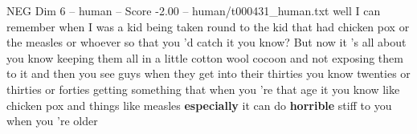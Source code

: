 \begin{textsample}{NEG Dim 6 – human – Score -2.00 – human/t000431\_human.txt}  \label{ex:f6_neg_038}
well I can remember when I was a kid being taken round to the kid that had chicken pox or the measles or whoever so that you 'd catch it you know?
But now it 's all about you know keeping them all in a little cotton wool cocoon and not exposing them to it and then you see guys when they get into their thirties you know twenties or thirties or forties getting something that when you 're that age it you know like chicken pox and things like measles \textbf{especially} it can do \textbf{horrible} stiff to you when you 're older

\end{textsample}
